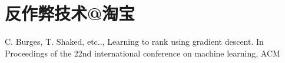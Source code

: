 
\chapter{ 反作弊技术@淘宝 }
\thispagestyle{empty}

\setlength{\fboxrule}{0pt}\setlength{\fboxsep}{0cm}
\noindent\shadowbox{
\begin{tcolorbox}[arc=0mm,colback=lightblue,colframe=darkblue,title=学习目标与要求]

\end{tcolorbox}}
\setlength{\fboxrule}{1pt}\setlength{\fboxsep}{4pt} 


\begin{thebibliography}{99}
 C. Burges, T. Shaked, etc.., Learning to rank 
using gradient descent. In Proceedings of the 22nd international 
conference on machine learning, ACM
\end{thebibliography}

 
